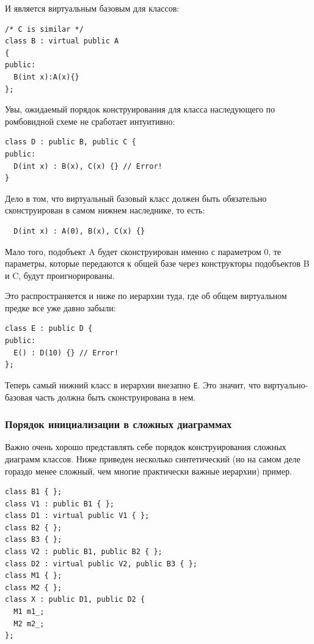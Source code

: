 \documentclass[a4paper,12pt,oneside]{article}
\begin{document}
И является виртуальным базовым для классов:

\begin{lstlisting}
/* C is similar */
class B : virtual public A
{
public:
  B(int x):A(x){}
};
\end{lstlisting}

Увы, ожидаемый порядок конструирования для класса наследующего по ромбовидной схеме не сработает интуитивно:

\begin{lstlisting}
class D : public B, public C {
public:
  D(int x) : B(x), C(x) {} // Error!
}
\end{lstlisting}

Дело в том, что виртуальный базовый класс должен быть обязательно сконструирован в самом нижнем наследнике, то есть:

\begin{lstlisting}
  D(int x) : A(0), B(x), C(x) {} 
\end{lstlisting}

Мало того, подобъект A будет сконструирован именно с параметром 0, те параметры, которые передаются к общей базе через конструкторы подобъектов B и C, будут проигнорированы.

Это распространяется и ниже по иерархии туда, где об общем виртуальном предке все уже давно забыли:

\begin{lstlisting}
class E : public D {
public:
  E() : D(10) {} // Error!
};
\end{lstlisting}

Теперь самый нижний класс в иерархии внезапно \lstinline!E!. Это значит, что виртуально-базовая часть должна быть сконструирована в нем.

\subsubsection{Порядок инициализации в сложных диаграммах}\label{InitOrder}

Важно очень хорошо представлять себе порядок конструирования сложных диаграмм классов. Ниже приведен несколько синтетический (но на самом деле гораздо менее сложный, чем многие практически важные иерархии) пример.

\begin{lstlisting}
class B1 { };
class V1 : public B1 { };
class D1 : virtual public V1 { };
class B2 { };
class B3 { };
class V2 : public B1, public B2 { };
class D2 : virtual public V2, public B3 { };
class M1 { };
class M2 { };
class X : public D1, public D2 {
  M1 m1_;
  M2 m2_;
};
\end{lstlisting}
\end{document}
